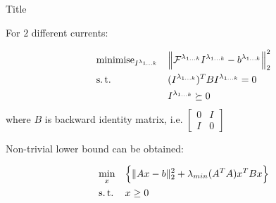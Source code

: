\documentclass[../main.tex]{subfiles}
\begin{document}
\begin{frame}[t]{Title}

For $2$ different currents:

\begin{equation*}
\begin{aligned}
& \operatorname{minimise}_{I^{\lambda_{1\ldots k}}} 
& & \Big\| \mathcal{F}^{\lambda_{1 \ldots k}} I^{\lambda_{1\ldots k}} - b^{\lambda_{1 \ldots k}} \Big\|_2^2 \\
& \operatorname{s.t.}
& & (I^{\lambda_{1\ldots k}})^T B I^{\lambda_{1\ldots k}} = 0 \\
&&& I^{\lambda_{1\ldots k}} \succeq 0 \\
\end{aligned}
\end{equation*}
where $B$ is backward identity matrix, i.e. $\begin{bmatrix} 0 & I \\ I & 0\end{bmatrix}$


Non-trivial lower bound can be obtained:

\begin{equation*}
\begin{aligned}
& \min_{x} 
& & \Big\{\| Ax - b \|_2^2 + \lambda_{min} (A^TA) x^T B x \Big\} \\
& \operatorname{s.t.}
& & x \ge 0 \\
\end{aligned}
\end{equation*}

\end{frame}





%
%
\end{document}
